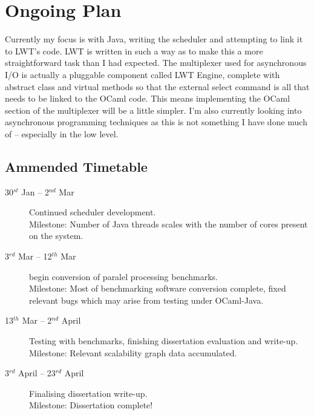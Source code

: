 \documentclass[a4paper]{article}
\begin{document}
\section{Ongoing Plan}
\label{Ongoing Plan}
Currently my focus is with Java, writing the scheduler and attempting to link it to LWT's code. LWT is written in such a way as to make this a more straightforward task than I had expected. The multiplexer used for asynchronous I/O is actually a pluggable component called LWT Engine, complete with abstract class and virtual methods so that the external select command is all that needs to be linked to the OCaml code. This means implementing the OCaml section of the multiplexer will be a little simpler. I'm also currently looking into asynchronous programming techniques as this is not something I have done much of -- especially in the low level.

\subsection{Ammended Timetable}
\begin{description}
\item[30$^{st}$ Jan -- 2$^{nd}$ Mar] Continued scheduler development.\\
Milestone: Number of Java threads scales with the number of cores present on the system.

\item[3$^{rd}$ Mar -- 12$^{th}$ Mar] begin conversion of paralel processing benchmarks.\\
Milestone: Most of benchmarking software conversion complete, fixed relevant bugs which may arise from testing under OCaml-Java.

\item[13$^{th}$ Mar -- 2$^{nd}$ April] Testing with benchmarks, finishing dissertation evaluation and write-up.\\
Milestone: Relevant scalability graph data accumulated.

\item[3$^{rd}$ April -- 23$^{rd}$ April] Finalising dissertation write-up.\\
Milestone: Dissertation complete!
\end{description}
\end{document}

